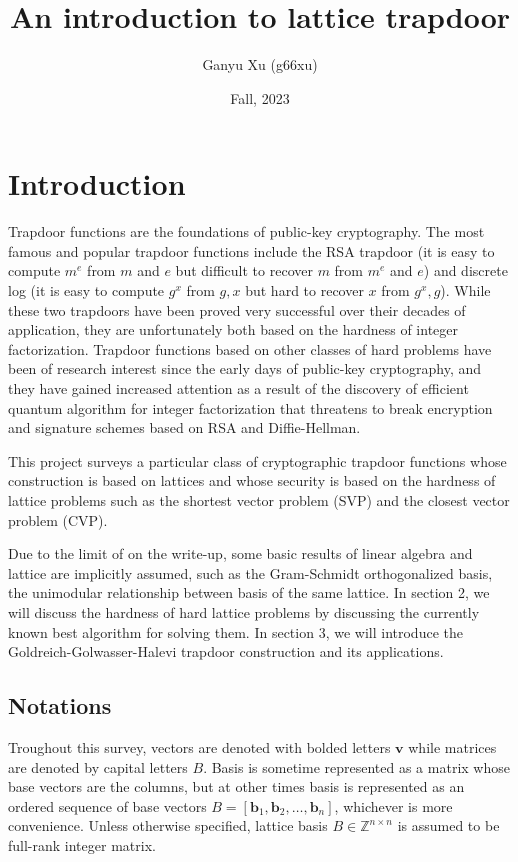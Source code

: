 \documentclass[letterpaper,12pt]{article}
\title{An introduction to lattice trapdoor}
\author{Ganyu Xu (g66xu)}
\date{Fall, 2023}
\begin{document}
\maketitle

\section{Introduction}
Trapdoor functions are the foundations of public-key cryptography. The most famous and popular trapdoor functions include the RSA trapdoor (it is easy to compute $m^e$ from $m$ and $e$ but difficult to recover $m$ from $m^e$ and $e$) and discrete log (it is easy to compute $g^x$ from $g, x$ but hard to recover $x$ from $g^x, g$). While these two trapdoors have been proved very successful over their decades of application, they are unfortunately both based on the hardness of integer factorization. Trapdoor functions based on other classes of hard problems have been of research interest since the early days of public-key cryptography, and they have gained increased attention as a result of the discovery of efficient quantum algorithm for integer factorization that threatens to break encryption and signature schemes based on RSA and Diffie-Hellman.

This project surveys a particular class of cryptographic trapdoor functions whose construction is based on lattices and whose security is based on the hardness of lattice problems such as the shortest vector problem (SVP) and the closest vector problem (CVP).

Due to the limit of on the write-up, some basic results of linear algebra and lattice are implicitly assumed, such as the Gram-Schmidt orthogonalized basis, the unimodular relationship between basis of the same lattice. In section 2, we will discuss the hardness of hard lattice problems by discussing the currently known best algorithm for solving them. In section 3, we will introduce the Goldreich-Golwasser-Halevi trapdoor construction and its applications.

\subsection{Notations}
Troughout this survey, vectors are denoted with bolded letters $\mathbf{v}$ while matrices are denoted by capital letters $B$. Basis is sometime represented as a matrix whose base vectors are the columns, but at other times basis is represented as an ordered sequence of base vectors $B = [\mathbf{b}_1, \mathbf{b}_2, \ldots, \mathbf{b}_n]$, whichever is more convenience. Unless otherwise specified, lattice basis $B \in \mathbb{Z}^{n \times n}$ is assumed to be full-rank integer matrix.
\end{document}
